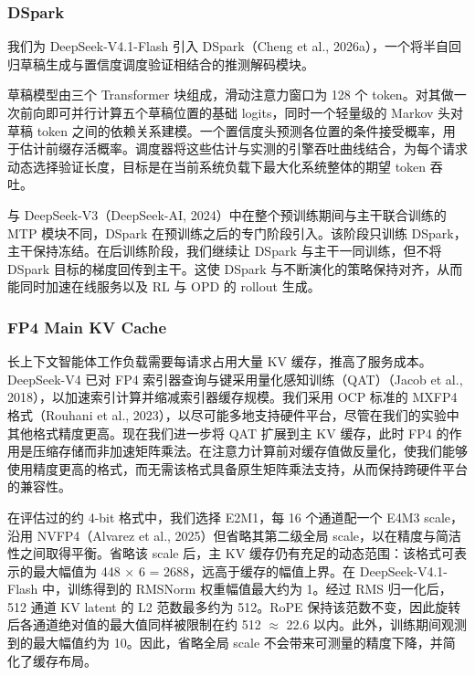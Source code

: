 \documentclass[
  10
]{article}
\begin{document}
\subsubsection{DSpark}\label{dspark}

我们为 DeepSeek-V4.1-Flash 引入 DSpark（Cheng et al., 2026a），一个将半自回归草稿生成与置信度调度验证相结合的推测解码模块。

草稿模型由三个 Transformer 块组成，滑动注意力窗口为 128 个 token。对其做一次前向即可并行计算五个草稿位置的基础 logits，同时一个轻量级的 Markov 头对草稿 token 之间的依赖关系建模。一个置信度头预测各位置的条件接受概率，用于估计前缀存活概率。调度器将这些估计与实测的引擎吞吐曲线结合，为每个请求动态选择验证长度，目标是在当前系统负载下最大化系统整体的期望 token 吞吐。

与 DeepSeek-V3（DeepSeek-AI, 2024）中在整个预训练期间与主干联合训练的 MTP 模块不同，DSpark 在预训练之后的专门阶段引入。该阶段只训练 DSpark，主干保持冻结。在后训练阶段，我们继续让 DSpark 与主干一同训练，但不将 DSpark 目标的梯度回传到主干。这使 DSpark 与不断演化的策略保持对齐，从而能同时加速在线服务以及 RL 与 OPD 的 rollout 生成。

\subsubsection{FP4 Main KV Cache}\label{fp4-main-kv-cache}

长上下文智能体工作负载需要每请求占用大量 KV 缓存，推高了服务成本。DeepSeek-V4 已对 FP4 索引器查询与键采用量化感知训练（QAT）（Jacob et al., 2018），以加速索引计算并缩减索引器缓存规模。我们采用 OCP 标准的 MXFP4 格式（Rouhani et al., 2023），以尽可能多地支持硬件平台，尽管在我们的实验中其他格式精度更高。现在我们进一步将 QAT 扩展到主 KV 缓存，此时 FP4 的作用是压缩存储而非加速矩阵乘法。在注意力计算前对缓存值做反量化，使我们能够使用精度更高的格式，而无需该格式具备原生矩阵乘法支持，从而保持跨硬件平台的兼容性。

在评估过的约 4-bit 格式中，我们选择 E2M1，每 16 个通道配一个 E4M3 scale，沿用 NVFP4（Alvarez et al., 2025）但省略其第二级全局 scale，以在精度与简洁性之间取得平衡。省略该 scale 后，主 KV 缓存仍有充足的动态范围：该格式可表示的最大幅值为 448 \(\times\) 6 = 2688，远高于缓存的幅值上界。在 DeepSeek-V4.1-Flash 中，训练得到的 RMSNorm 权重幅值最大约为 1。经过 RMS 归一化后，512 通道 KV latent 的 L2 范数最多约为 512。RoPE 保持该范数不变，因此旋转后各通道绝对值的最大值同样被限制在约 512 \(\approx\) 22.6 以内。此外，训练期间观测到的最大幅值约为 10。因此，省略全局 scale 不会带来可测量的精度下降，并简化了缓存布局。
\end{document}
